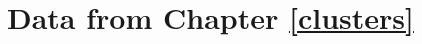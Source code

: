\documentclass{upenndiss}
\begin{document}
\appendix
\renewcommand{\arraystretch}{0.25}
\chapter{Data from Chapter \ref{clusters}}  \label{A}

%



\end{document}
